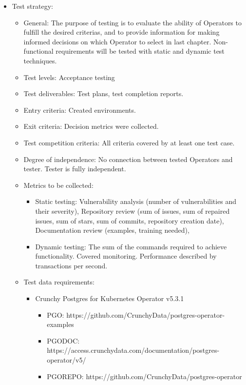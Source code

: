 \begin{itemize}
\begin{itemize}
          \end{itemize}
    \item Test strategy:
          \begin{itemize}
              \item General: The purpose of testing is to evaluate the ability of Operators to fulfill the desired criterias, and to provide information for making informed decisions on which Operator to select in last chapter. Non-functional requirements will be tested with static and dynamic test techniques.
              \item Test levels: Acceptance testing
              \item Test deliverables: Test plans, test completion reports.
              \item Entry criteria: Created environments.
              \item Exit criteria: Decision metrics were collected.
              \item Test competition criteria: All criteria covered by at least one test case.
              \item Degree of independence: No connection between tested Operators and tester. Tester is fully independent.
              \item Metrics to be collected:
                    \begin{itemize}
                        \item Static testing: Vulnerability analysis (number of vulnerabilities and their severity), Repository review (sum of issues, sum of repaired issues, sum of stars, sum of commits, repository creation date), Documentation review (examples, training needed),
                        \item Dynamic testing:  The sum of the commands required to achieve functionality. Covered monitoring. Performance described by transactions per second.
                    \end{itemize}
              \item Test data requirements:
                    \begin{itemize}
                        \item Crunchy Postgres for Kubernetes Operator v5.3.1
                              \begin{itemize}
                                  \item PGO: https://github.com/CrunchyData/postgres-operator-examples
                                  \item PGODOC: https://access.crunchydata.com/documentation/postgres-operator/v5/
                                  \item PGOREPO: https://github.com/CrunchyData/postgres-operator
                              \end{itemize}


\end{itemize}
\end{itemize}
\end{itemize}
